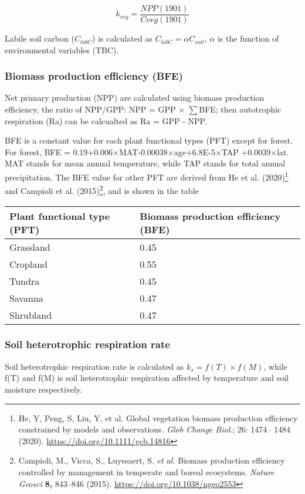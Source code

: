 \documentclass[
]{article}
\begin{document}
\[k_{veg}=\frac{NPP(1901)}{Cveg(1901)}\]

Labile soil carbon (\(C_{labC}\)) is calculated as
\(C_{labC} = \alpha C_{soil}\), \(\alpha\) is the function of
environmental variables (TBC).

\hypertarget{biomass-production-efficiency-bfe}{%
\subsubsection{Biomass production efficiency
(BFE)}\label{biomass-production-efficiency-bfe}}

Net primary production (NPP) are calculated using biomass production
efficiency, the ratio of NPP/GPP: NPP = GPP × \(\sum\)BFE; then
autotrophic respiration (Ra) can be calcualted as Ra = GPP - NPP.

BFE is a constant value for each plant functional types (PFT) except for
forest. For forest, BFE = 0.19+0.006×MAT-0.00038×age+6.8E-5×TAP
+0.0039×\textbar lat\textbar. MAT stands for mean annual temperature,
while TAP stands for total annual precipitation. The BFE value for other
PFT are derived from He et al. (2020)\footnote{He, Y, Peng, S, Liu, Y,
  et al. Global vegetation biomass production efficiency constrained by
  models and observations. \emph{Glob Change Biol}.; 26: 1474-- 1484
  (2020). \url{https://doi.org/10.1111/gcb.14816}} and Campioli et al.
(2015)\footnote{Campioli, M., Vicca, S., Luyssaert, S. \emph{et al.}
  Biomass production efficiency controlled by management in temperate
  and boreal ecosystems. \emph{Nature Geosci} \textbf{8,} 843--846
  (2015). \url{https://doi.org/10.1038/ngeo2553}}, and is shown in the
table

\begin{longtable}[]{@{}ll@{}}
\toprule
Plant functional type (PFT) & Biomass production efficiency
(BFE)\tabularnewline
\midrule
\endhead
Grassland & 0.45\tabularnewline
Cropland & 0.55\tabularnewline
Tundra & 0.45\tabularnewline
Savanna & 0.47\tabularnewline
Shrubland & 0.47\tabularnewline
\bottomrule
\end{longtable}

\hypertarget{soil-heterotrophic-respiration-rate}{%
\subsubsection{Soil heterotrophic respiration
rate}\label{soil-heterotrophic-respiration-rate}}

Soil heterotrophic respiration rate is calculated as
\(k_s = f(T) \times f(M)\), while f(T) and f(M) is soil heterotrophic
respiration affected by temperature and soil moisture respectively.
\end{document}
